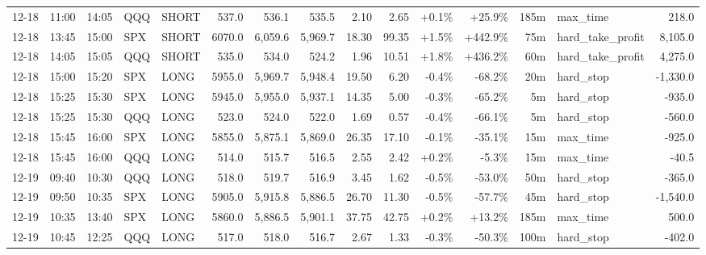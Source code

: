 \documentclass[11pt,a4paper,twoside]{article}
\begin{document}
\begin{landscape}
\begin{center}
\begin{longtable}{>{\color{txtmain}}l l l l l r r r r r r r r >{\color{txtmain}}l r}
12-18 & 11:00 & 14:05 & QQQ & SHORT & 537.0 & 536.1 & 535.5 & 2.10 & 2.65 & \textcolor{wingreen}{+0.1\%} & \textcolor{wingreen}{+25.9\%} & 185m & max\_time & \textcolor{wingreen}{218.0} \\
12-18 & 13:45 & 15:00 & SPX & SHORT & 6070.0 & 6,059.6 & 5,969.7 & 18.30 & 99.35 & \textcolor{wingreen}{+1.5\%} & \textcolor{wingreen}{+442.9\%} & 75m & hard\_take\_profit & \textcolor{wingreen}{8,105.0} \\
12-18 & 14:05 & 15:05 & QQQ & SHORT & 535.0 & 534.0 & 524.2 & 1.96 & 10.51 & \textcolor{wingreen}{+1.8\%} & \textcolor{wingreen}{+436.2\%} & 60m & hard\_take\_profit & \textcolor{wingreen}{4,275.0} \\
12-18 & 15:00 & 15:20 & SPX & LONG & 5955.0 & 5,969.7 & 5,948.4 & 19.50 & 6.20 & \textcolor{lossred}{-0.4\%} & \textcolor{lossred}{-68.2\%} & 20m & hard\_stop & \textcolor{lossred}{-1,330.0} \\
12-18 & 15:25 & 15:30 & SPX & LONG & 5945.0 & 5,955.0 & 5,937.1 & 14.35 & 5.00 & \textcolor{lossred}{-0.3\%} & \textcolor{lossred}{-65.2\%} & 5m & hard\_stop & \textcolor{lossred}{-935.0} \\
12-18 & 15:25 & 15:30 & QQQ & LONG & 523.0 & 524.0 & 522.0 & 1.69 & 0.57 & \textcolor{lossred}{-0.4\%} & \textcolor{lossred}{-66.1\%} & 5m & hard\_stop & \textcolor{lossred}{-560.0} \\
12-18 & 15:45 & 16:00 & SPX & LONG & 5855.0 & 5,875.1 & 5,869.0 & 26.35 & 17.10 & \textcolor{lossred}{-0.1\%} & \textcolor{lossred}{-35.1\%} & 15m & max\_time & \textcolor{lossred}{-925.0} \\
12-18 & 15:45 & 16:00 & QQQ & LONG & 514.0 & 515.7 & 516.5 & 2.55 & 2.42 & \textcolor{wingreen}{+0.2\%} & \textcolor{lossred}{-5.3\%} & 15m & max\_time & \textcolor{lossred}{-40.5} \\
12-19 & 09:40 & 10:30 & QQQ & LONG & 518.0 & 519.7 & 516.9 & 3.45 & 1.62 & \textcolor{lossred}{-0.5\%} & \textcolor{lossred}{-53.0\%} & 50m & hard\_stop & \textcolor{lossred}{-365.0} \\
12-19 & 09:50 & 10:35 & SPX & LONG & 5905.0 & 5,915.8 & 5,886.5 & 26.70 & 11.30 & \textcolor{lossred}{-0.5\%} & \textcolor{lossred}{-57.7\%} & 45m & hard\_stop & \textcolor{lossred}{-1,540.0} \\
12-19 & 10:35 & 13:40 & SPX & LONG & 5860.0 & 5,886.5 & 5,901.1 & 37.75 & 42.75 & \textcolor{wingreen}{+0.2\%} & \textcolor{wingreen}{+13.2\%} & 185m & max\_time & \textcolor{wingreen}{500.0} \\
12-19 & 10:45 & 12:25 & QQQ & LONG & 517.0 & 518.0 & 516.7 & 2.67 & 1.33 & \textcolor{lossred}{-0.3\%} & \textcolor{lossred}{-50.3\%} & 100m & hard\_stop & \textcolor{lossred}{-402.0} \\

\end{longtable}
\end{center}
\end{landscape}
\end{document}
